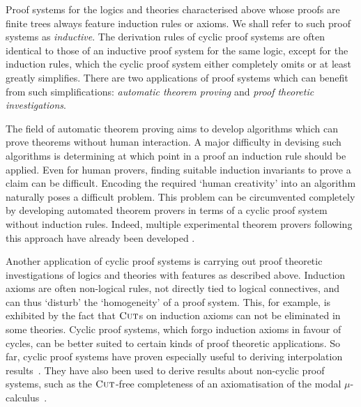 Proof systems for the logics and theories characterised above whose proofs are
finite trees always feature induction rules or axioms. We shall refer to such
proof systems as \emph{inductive}. The derivation rules of cyclic proof systems
are often identical to those of an inductive proof system for the same logic,
except for the induction rules, which the cyclic proof system either completely
omits or at least greatly simplifies. There are two applications of proof
systems which can benefit from such simplifications: \emph{automatic theorem
proving} and \emph{proof theoretic investigations}.

The field of automatic theorem proving aims to develop algorithms which can
prove theorems without human interaction. A major difficulty in devising such
algorithms is determining at which point in a proof an induction rule should be
applied. Even for human provers, finding suitable induction invariants to prove
a claim can be difficult. Encoding the required `human creativity' into an
algorithm naturally poses a difficult problem. This problem can be circumvented
completely by developing automated theorem provers in terms of a cyclic proof
system without induction rules. Indeed, multiple experimental theorem provers following
this approach have already been developed
\parencite[see][]{brotherstonAutomatedCyclicEntailment2011,brotherstonGenericCyclicTheorem2012,tellezAutomaticallyVerifyingTemporal2017}.

Another application of cyclic proof systems is carrying out proof theoretic investigations
of logics and theories with features as described above. Induction axioms are
often non-logical rules, not directly tied to logical connectives, and can thus
`disturb' the `homogeneity' of a proof system. This, for example, is exhibited
by the fact that $\textsc{Cut}$s on induction axioms can not be eliminated in some theories. Cyclic proof systems, which
forgo induction axioms in favour of cycles, can be better suited to certain kinds
of proof theoretic applications. So far, cyclic proof systems have proven especially
useful to deriving interpolation
results~\parencite[see][]{shamkanovCircularProofsGodelLob2014,savateevNonWellFoundedProofsGrzegorczyk2018,martiFocusSystemAlternationFree2021,afshariUniformInterpolationCyclic2021,afshariLyndonInterpolationModal2022}.
They have also been used to derive results about non-cyclic proof systems, such
as the $\textsc{Cut}$-free completeness of an axiomatisation of the modal
$\mu$-calculus~\parencite{afshariFinitaryProofSystems2016}.


